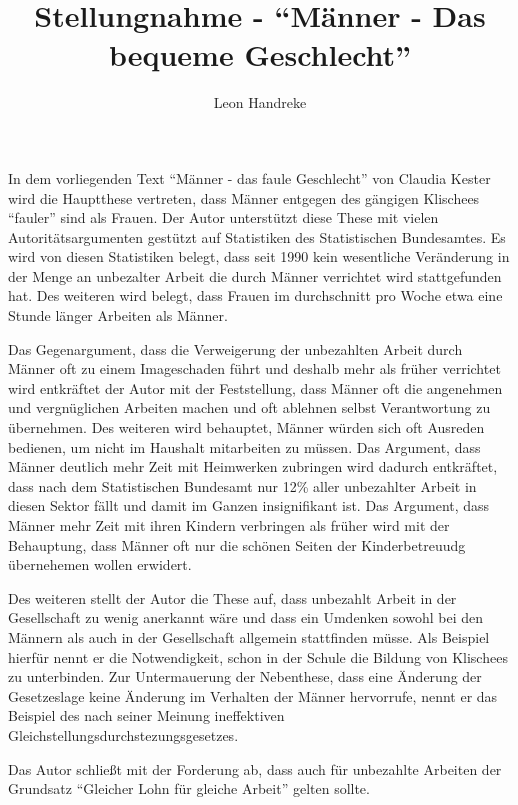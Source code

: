 \documentclass[11pt]{article}
\title{Stellungnahme - ``Männer - Das bequeme Geschlecht''}
\author{Leon Handreke}
\date{}                                           %
\begin{document}
\maketitle

\selectfont

\doublespacing

In dem vorliegenden Text ``Männer - das faule Geschlecht'' von Claudia Kester wird die Hauptthese vertreten, dass Männer entgegen des gängigen Klischees ``fauler'' sind als Frauen. Der Autor unterstützt diese These mit vielen Autoritätsargumenten gestützt auf Statistiken des Statistischen Bundesamtes. Es wird von diesen Statistiken belegt, dass seit 1990 kein wesentliche Veränderung in der Menge an unbezalter Arbeit die durch Männer verrichtet wird stattgefunden hat. Des weiteren wird belegt, dass Frauen im durchschnitt pro Woche etwa eine Stunde länger Arbeiten als Männer.

Das Gegenargument, dass die Verweigerung der unbezahlten Arbeit durch Männer oft zu einem Imageschaden führt und deshalb mehr als früher verrichtet wird entkräftet der Autor mit der Feststellung, dass Männer oft die angenehmen und vergnüglichen Arbeiten machen und oft ablehnen selbst Verantwortung zu übernehmen. Des weiteren wird behauptet, Männer würden sich oft Ausreden bedienen, um nicht im Haushalt mitarbeiten zu müssen. Das Argument, dass Männer deutlich mehr Zeit mit Heimwerken zubringen wird dadurch entkräftet, dass nach dem Statistischen Bundesamt nur 12\% aller unbezahlter Arbeit in diesen Sektor fällt und damit im Ganzen insignifikant ist. Das Argument, dass Männer mehr Zeit mit ihren Kindern verbringen als früher wird mit der Behauptung, dass Männer oft nur die schönen Seiten der Kinderbetreuudg übernehemen wollen erwidert.

Des weiteren stellt der Autor die These auf, dass unbezahlt Arbeit in der Gesellschaft zu wenig anerkannt wäre und dass ein Umdenken sowohl bei den Männern als auch in der Gesellschaft allgemein stattfinden müsse. Als Beispiel hierfür nennt er die Notwendigkeit, schon in der Schule die Bildung von Klischees zu unterbinden. Zur Untermauerung der Nebenthese, dass eine Änderung der Gesetzeslage keine Änderung im Verhalten der Männer hervorrufe, nennt er das Beispiel des nach seiner Meinung ineffektiven Gleichstellungsdurchstezungsgesetzes.

Das Autor schließt mit der Forderung ab, dass auch für unbezahlte Arbeiten der Grundsatz ``Gleicher Lohn für gleiche Arbeit'' gelten sollte.
\end{document}
